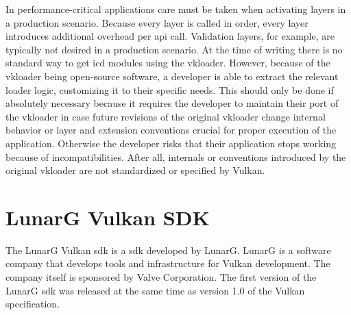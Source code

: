     In performance-critical applications care must be taken when activating layers in a production scenario.
    Because every layer is called in order, every layer introduces additional overhead per \gls{api} call.
    Validation layers, for example, are typically not desired in a production scenario.
    At the time of writing there is no standard way to get \gls{icd} modules using the \gls{vkloader}.
    However, because of the \gls{vkloader} being open-source software, a developer is able to extract the relevant loader logic, customizing it to their specific needs.
    This should only be done if absolutely necessary because it requires the developer to maintain their port of the \gls{vkloader} in case future revisions of the original \gls{vkloader} change internal behavior or layer and extension conventions crucial for proper execution of the application.
    Otherwise the developer risks that their application stops working because of incompatibilities.
    After all, internals or conventions introduced by the original \gls{vkloader} are not standardized or specified by Vulkan.






  \section{LunarG Vulkan SDK}
  \label{sec:LunarGSDK}
    The LunarG Vulkan \gls{sdk}\cite{lunargvulkansdk} is a \acrlong{sdk} developed by LunarG.
    LunarG is a software company that develops tools and infrastructure for Vulkan development.
    The company itself is sponsored by Valve Corporation.
    The first version of the LunarG \gls{sdk} was released at the same time as version 1.0 of the Vulkan specification.

